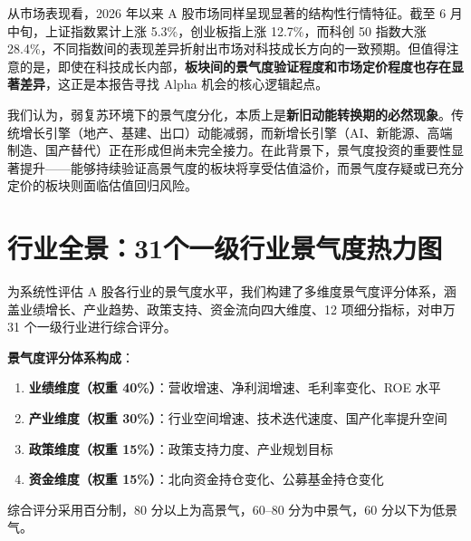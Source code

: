 从市场表现看，2026 年以来 A 股市场同样呈现显著的结构性行情特征。截至 6 月中旬，上证指数累计上涨 5.3\%，创业板指上涨 12.7\%，而科创 50 指数大涨 28.4\%，不同指数间的表现差异折射出市场对科技成长方向的一致预期。但值得注意的是，即使在科技成长内部，\textbf{板块间的景气度验证程度和市场定价程度也存在显著差异}，这正是本报告寻找 Alpha 机会的核心逻辑起点。

\smallskip

我们认为，弱复苏环境下的景气度分化，本质上是\textbf{新旧动能转换期的必然现象}。传统增长引擎（地产、基建、出口）动能减弱，而新增长引擎（AI、新能源、高端制造、国产替代）正在形成但尚未完全接力。在此背景下，景气度投资的重要性显著提升——能够持续验证高景气度的板块将享受估值溢价，而景气度存疑或已充分定价的板块则面临估值回归风险。

\section{行业全景：31个一级行业景气度热力图}

为系统性评估 A 股各行业的景气度水平，我们构建了多维度景气度评分体系，涵盖业绩增长、产业趋势、政策支持、资金流向四大维度、12 项细分指标，对申万 31 个一级行业进行综合评分。

\smallskip

\textbf{景气度评分体系构成}：

\begin{enumerate}[leftmargin=2em]
\item \textbf{业绩维度（权重 40\%）}：营收增速、净利润增速、毛利率变化、ROE 水平
\item \textbf{产业维度（权重 30\%）}：行业空间增速、技术迭代速度、国产化率提升空间
\item \textbf{政策维度（权重 15\%）}：政策支持力度、产业规划目标
\item \textbf{资金维度（权重 15\%）}：北向资金持仓变化、公募基金持仓变化
\end{enumerate}

综合评分采用百分制，80 分以上为高景气，60--80 分为中景气，60 分以下为低景气。

